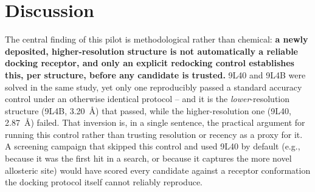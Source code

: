 \documentclass[11pt]{article}
\begin{document}
\section*{Discussion}

The central finding of this pilot is methodological rather than chemical:
\textbf{a newly deposited, higher-resolution structure is not automatically
a reliable docking receptor, and only an explicit redocking control
establishes this, per structure, before any candidate is trusted.} 9L40 and
9L4B were solved in the same study, yet only one reproducibly passed a
standard accuracy control under an otherwise identical protocol -- and it
is the \emph{lower}-resolution structure (9L4B, 3.20~{\AA}) that passed,
while the higher-resolution one (9L40, 2.87~{\AA}) failed. That inversion
is, in a single sentence, the practical argument for running this control
rather than trusting resolution or recency as a proxy for it. A screening
campaign that skipped this control and used 9L40 by default (e.g., because
it was the first hit in a search, or because it captures the more novel
allosteric site) would have scored every candidate against a receptor
conformation the docking protocol itself cannot reliably reproduce.
\end{document}
